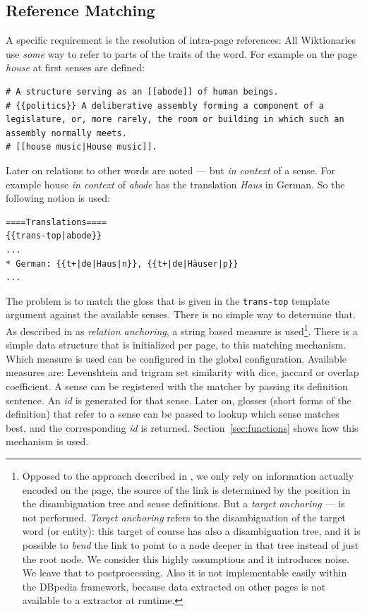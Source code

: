 \subsection{Reference Matching}\label{sec:matching}
A \wik specific requirement is the resolution of intra-page references: All Wiktionaries use \textit{some} way to refer to parts of the traits of the word. For example on the page \textit{house} at first senses are defined:
\begin{lstlisting}[basicstyle=\tiny\ttfamily]
# A structure serving as an [[abode]] of human beings.
# {{politics}} A deliberative assembly forming a component of a legislature, or, more rarely, the room or building in which such an assembly normally meets.
# [[house music|House music]].
\end{lstlisting}
Later on relations to other words are noted --- but \textit{in context} of a sense. For example house \textit{in context} of \textit{abode} has the translation \textit{Haus} in German. So the following notion is used:
\begin{lstlisting}[basicstyle=\tiny\ttfamily]
====Translations====
{{trans-top|abode}}
...
* German: {{t+|de|Haus|n}}, {{t+|de|Häuser|p}}
...
\end{lstlisting}
The problem is to match the gloss that is given in the \texttt{trans-top} template argument against the available senses. There is no simple way to determine that. As described in \cite{meyer_2011b} as \textit{relation anchoring}, a string based measure is used\footnote{Opposed to the approach described in \cite{meyer_2011b}, we only rely on information actually encoded on the page, the source of the link is determined by the position in the disambiguation tree and sense definitions. But a \textit{target anchoring} --- is not performed. \textit{Target anchoring} refers to the disambiguation of the target word (or entity): this target of course has also a disambiguation tree, and it is possible to \textit{bend} the link to point to a node deeper in that tree instead of just the root node. We consider this highly assumptious and it introduces noise. We leave that to postprocessing. Also it is not implementable easily within the DBpedia framework, because data extracted on other pages is not available to a extractor at runtime.}. There is a simple data structure that is initialized per page, to this matching mechanism. Which measure is used can be configured in the global configuration. Available measures are: Levenshtein and trigram set similarity with dice, jaccard or overlap coefficient. A sense can be registered with the matcher by passing its definition sentence. An \textit{id} is generated for that sense. Later on, glosses (short forms of the definition) that refer to a sense can be passed to lookup which sense matches best, and the corresponding \textit{id} is returned. Section~\ref{sec:functions} shows how this mechanism is used.



